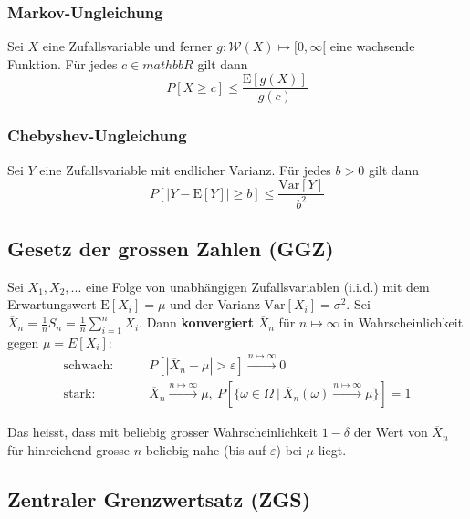 \documentclass[11pt]{article}
\newcommand{\E}{\text{E}}
\newcommand{\Var}{\text{Var}}
\begin{document}
\subsubsection{Markov-Ungleichung}

Sei $X$ eine Zufallsvariable und ferner $g: \mathcal{W}(X) \mapsto [0, \infty[$ eine wachsende Funktion. Für jedes $c \in mathbb{R}$ gilt dann
\begin{equation*}
	P[X \geq c] \leq \frac{\E[g(X)]}{g(c)}
\end{equation*}

\subsubsection{Chebyshev-Ungleichung}

Sei $Y$ eine Zufallsvariable mit endlicher Varianz. Für jedes $b > 0$ gilt dann
\begin{equation*}
	P[|Y - \E[Y]| \geq b] \leq \frac{\Var[Y]}{b^2}
\end{equation*}

\subsection{Gesetz der grossen Zahlen (GGZ)}

Sei $X_1, X_2, ...$ eine Folge von unabhängigen Zufallsvariablen (i.i.d.) mit dem Erwartungswert $\E[X_i] = \mu$ und der Varianz $\Var[X_i] = \sigma^2$. Sei $\overline{X}_n = \frac{1}{n}S_n = \frac{1}{n}\sum_{i=1}^n X_i$. Dann \textbf{konvergiert} $\overline{X}_n$ für $n \mapsto \infty$ in Wahrscheinlichkeit gegen $\mu = E[X_i]$:
\begin{equation*}
\begin{split}
	\text{schwach:} & \qquad P[|\overline{X}_n - \mu| > \varepsilon] \xrightarrow{n \mapsto \infty} 0 \\
	\text{stark:} & \qquad \overline{X}_n \xrightarrow{n\mapsto\infty}\mu,\ P[\{\omega \in \Omega\ |\  \overline{X}_n(\omega) \xrightarrow{n\mapsto\infty}\mu\}] = 1 
\end{split}
\end{equation*}

Das heisst, dass mit beliebig grosser Wahrscheinlichkeit $1- \delta$ der Wert von $\overline{X}_n$ für hinreichend grosse $n$ beliebig nahe (bis auf $\varepsilon$) bei $\mu$ liegt.

\subsection{Zentraler Grenzwertsatz (ZGS)}
\end{document}
